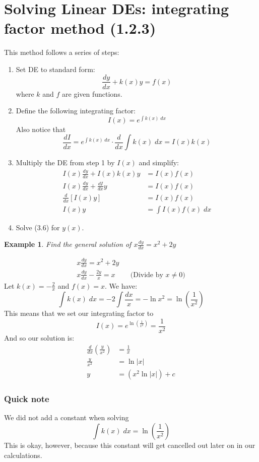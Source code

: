 \documentclass{report}
\newtheorem{ex}{Example}[section]
\begin{document}
\section{Solving Linear DEs: integrating factor method (1.2.3)}
This method follows a series of steps:
\begin{enumerate}
    \item Set DE to standard form:
    $$ \frac{dy}{dx} + k(x)y = f(x)$$
    where $k$ and $f$ are given functions.
    \item Define the following integrating factor:
    $$I(x) = e^{\int k(x) \; dx}$$
    Also notice that
    $$\frac{dI}{dx} = e^{\int k(x) \; dx} \cdot \frac{d}{dx}\int k(x) \;dx = I(x) k(x)$$
    \item Multiply the DE from step 1 by $I(x)$ and simplify:
    \begin{align}
        I(x) \frac{dy}{dx} + I(x)k(x)y &= I(x)f(x) \\
        I(x)\frac{dy}{dx} + \frac{dI}{dx}y &= I(x)f(x) \\
        \frac{d}{dx}\left[I(x)y\right] &= I(x)f(x) \\
        I(x)y &= \int I(x)f(x) \; dx
    \end{align}
    \item Solve (3.6) for $y(x)$.
\end{enumerate}
\begin{ex}
Find the general solution of $x\frac{dy}{dx} = x^2 + 2y$
\end{ex}
\begin{align*}
x\frac{dy}{dx} = x^2 + 2y \\
x\frac{dy}{dx} - \frac{2y}{x} = x  && \text{(Divide by }x \neq 0)
\end{align*}
Let $k(x) = -\frac{2}{x}$ and $f(x) = x$. We have:
$$
\int k(x) \; dx = -2 \int \frac{dx}{x} = -\ln x^2 = \ln \left(\frac{1}{x^2}\right)
$$
This means that we set our integrating factor to
$$I(x) = e^{\ln\left(\frac{1}{x^2}\right)} = \frac{1}{x^2}$$
And so our solution is:
\begin{align*}
    \frac{d}{dx}\left(\frac{y}{x^2}\right) &= \frac{1}{x} \\
    \frac{y}{x^2} &= \ln |x| \\
    y &= (x^2 \ln |x|) + c
\end{align*}
\subsubsection{Quick note}
We did not add a constant when solving
$$
\int k(x) \; dx = \ln \left(\frac{1}{x^2}\right)
$$
This is okay, however, because this constant will get cancelled out later on in our calculations.
\end{document}
